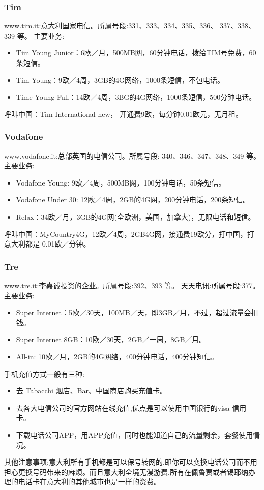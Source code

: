 \documentclass[3pt,a5paper,openright,twoside]{book}
\begin{document}
\subsubsection{Tim}
www.tim.it:意大利国家电信。所属号段:331、333、334、335、336、 337、338、339 等。
主要业务:
\begin{itemize}
\item Tim Young Junior：6欧／月，500MB网，60分钟电话，拨给TIM号免费，60条短信。
\item Tim Young：9欧／4周，3GB的4G网络，1000条短信，不包电话。
\item Time Young Full：14欧／4周，3BG的4G网络，1000条短信，500分钟电话。
\end{itemize}
呼叫中国：Tim International new， 开通费9欧，每分钟0.01欧元，无月租。

\subsubsection{Vodafone}
www.vodafone.it:总部英国的电信公司。所属号段: 340、346、347、348、349 等。 
主要业务:
\begin{itemize}
\item Vodafone Young:  9欧／4周，500MB网，100分钟电话，50条短信。
\item Vodafone Under 30:  12欧／4周，2GB的4G网，200分钟电话，200条短信。
\item Relax：34欧／月，3GB的4G网(全欧洲，美国，加拿大)，无限电话和短信。
\end{itemize}
呼叫中国：MyCountry4G，12欧／4周，2GB4G网，接通费19欧分，打中国，打意大利都是 0.01欧／分钟。



\subsubsection{Tre}
www.tre.it:李嘉诚投资的企业。所属号段:392、393 等。 天天电讯:所属号段:377。 
主要业务:
\begin{itemize}
\item  Super Internet：5欧／30天，100MB／天，即3GB／月，不过，超过流量会扣钱。
\item  Super Internet 8GB：10欧／30天，2GB／一周，8GB／月。
\item  All-in: 10欧／月，2GB的4G网络，400分钟电话，400分钟短信。
\end{itemize}


手机充值方式一般有三种:
\begin{itemize}
\item 去 Tabacchi 烟店、Bar、中国商店购买充值卡。 
\item 去各大电信公司的官方网站在线充值,优点是可以使用中国银行的visa 信用卡。 
\item 下载电话公司APP，用APP充值，同时也能知道自己的流量剩余，套餐使用情况。
\end{itemize}
 其他注意事项:意大利所有手机都是可以保号转网的,即你可以变换电话公司而不用担心更换号码带来的麻烦。而且意大利全境无漫游费,所有在佩鲁贾或者锡耶纳办理的电话卡在意大利的其他城市也是一样的资费。 
\end{document}
